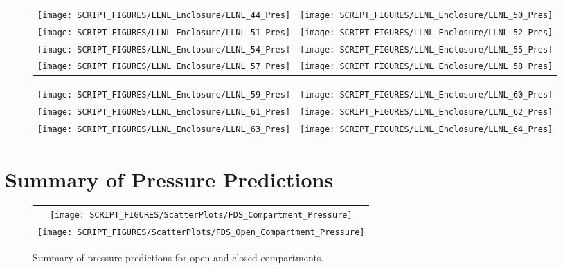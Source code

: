 \begin{figure}[p]
\begin{tabular*}{\textwidth}{l@{\extracolsep{\fill}}r}
\texttt{[image: SCRIPT\_FIGURES/LLNL\_Enclosure/LLNL\_44\_Pres]} &
\texttt{[image: SCRIPT\_FIGURES/LLNL\_Enclosure/LLNL\_50\_Pres]} \\
\texttt{[image: SCRIPT\_FIGURES/LLNL\_Enclosure/LLNL\_51\_Pres]} &
\texttt{[image: SCRIPT\_FIGURES/LLNL\_Enclosure/LLNL\_52\_Pres]} \\
\texttt{[image: SCRIPT\_FIGURES/LLNL\_Enclosure/LLNL\_54\_Pres]} &
\texttt{[image: SCRIPT\_FIGURES/LLNL\_Enclosure/LLNL\_55\_Pres]} \\
\texttt{[image: SCRIPT\_FIGURES/LLNL\_Enclosure/LLNL\_57\_Pres]} &
\texttt{[image: SCRIPT\_FIGURES/LLNL\_Enclosure/LLNL\_58\_Pres]}
\end{tabular*}
\label{LLNL_Enclosure_Pres_5}
\end{figure}

\begin{figure}[p]
\begin{tabular*}{\textwidth}{l@{\extracolsep{\fill}}r}
\texttt{[image: SCRIPT\_FIGURES/LLNL\_Enclosure/LLNL\_59\_Pres]} &
\texttt{[image: SCRIPT\_FIGURES/LLNL\_Enclosure/LLNL\_60\_Pres]} \\
\texttt{[image: SCRIPT\_FIGURES/LLNL\_Enclosure/LLNL\_61\_Pres]} &
\texttt{[image: SCRIPT\_FIGURES/LLNL\_Enclosure/LLNL\_62\_Pres]} \\
\texttt{[image: SCRIPT\_FIGURES/LLNL\_Enclosure/LLNL\_63\_Pres]} &
\texttt{[image: SCRIPT\_FIGURES/LLNL\_Enclosure/LLNL\_64\_Pres]}
\end{tabular*}
\label{LLNL_Enclosure_Pres_6}
\end{figure}


\clearpage

\section{Summary of Pressure Predictions}
\label{Compartment Over-Pressure}
\label{Open Compartment Over-Pressure}


\begin{figure}[h!]
\begin{center}
\begin{tabular}{c}
\texttt{[image: SCRIPT\_FIGURES/ScatterPlots/FDS\_Compartment\_Pressure]} \\
\texttt{[image: SCRIPT\_FIGURES/ScatterPlots/FDS\_Open\_Compartment\_Pressure]}
\end{tabular}
\end{center}
\caption[Summary of pressure predictions]{Summary of pressure predictions for open and closed compartments.}
\label{Pressure_Summary}
\end{figure}

